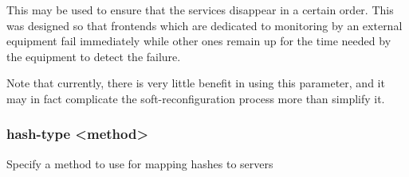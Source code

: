   This may be used to ensure that the services disappear in a certain order.
  This was designed so that frontends which are dedicated to monitoring by an
  external equipment fail immediately while other ones remain up for the time
  needed by the equipment to detect the failure.

  Note that currently, there is very little benefit in using this parameter,
  and it may in fact complicate the soft-reconfiguration process more than
  simplify it.

\subsubsection[hash-type]{hash-type <method>}
  Specify a method to use for mapping hashes to servers
  
  
